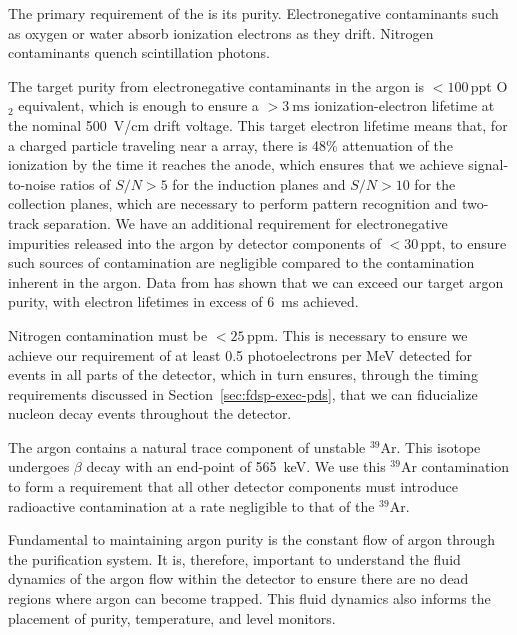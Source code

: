 The primary requirement of the  is its purity. Electronegative contaminants such as oxygen or water absorb ionization electrons as they drift. Nitrogen contaminants quench scintillation photons.

The target purity from electronegative contaminants in the argon is $<\!\!100$\,ppt O$_{2}$ equivalent, which is enough to ensure a $>\!\!\SI{3}{\milli\second}$ ionization-electron lifetime at the nominal \SI{500}{\volt/\centi\meter} drift voltage. This target electron lifetime means that, for a charged particle traveling near a  array, there is 48\% attenuation of the ionization by the time it reaches the anode, which ensures that we achieve signal-to-noise ratios of $S/N>5$ for the induction planes and $S/N>10$ for the collection planes, which are necessary to perform pattern recognition and two-track separation. We have an additional requirement for electronegative impurities released into the argon by detector components of $<\!30$\,ppt, to ensure such sources of contamination are negligible compared to the contamination inherent in the argon. Data from  has shown that we can exceed our target argon purity, with electron lifetimes in excess of \SI{6}{\milli\second} achieved.

Nitrogen contamination must be $<\!25$\,ppm. This is necessary to ensure we achieve our requirement of at least 0.5 photoelectrons per MeV detected for events in all parts of the detector, which in turn ensures, through the timing requirements discussed in Section~\ref{sec:fdsp-exec-pds}, that we can fiducialize nucleon decay events throughout the detector.

The argon contains a natural trace component of unstable $^{39}$Ar. This isotope undergoes $\beta$ decay with an end-point of \SI{565}{\kilo\electronvolt}.
We use this $^{39}$Ar contamination to form a requirement that all other detector components must introduce radioactive contamination at a rate negligible to that of the $^{39}$Ar.

Fundamental to maintaining argon purity is the constant flow of argon through the purification system. It is, therefore, important to understand the fluid dynamics of the argon flow within the detector to ensure there are no dead regions where argon can become trapped. This fluid dynamics also informs the placement of purity, temperature, and level monitors.


